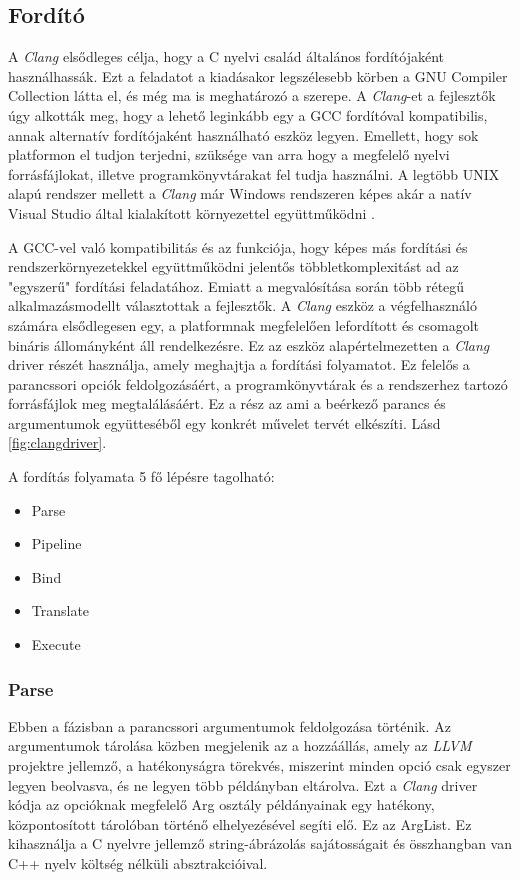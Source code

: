 \documentclass[a4paper,12pt]{report}
\begin{document}
\subsection{Fordító}
A \emph{Clang} elsődleges célja, hogy a C nyelvi család általános fordítójaként használhassák. Ezt a feladatot a kiadásakor legszélesebb körben a GNU Compiler Collection látta el, és még ma is meghatározó a szerepe. A \emph{Clang}-et a fejlesztők úgy alkották meg, hogy a lehető leginkább egy a GCC fordítóval kompatibilis, annak alternatív fordítójaként használható eszköz legyen. Emellett, hogy sok platformon el tudjon terjedni, szüksége van arra hogy a megfelelő nyelvi forrásfájlokat, illetve programkönyvtárakat fel tudja használni. A legtöbb UNIX alapú rendszer mellett a \emph{Clang} már Windows rendszeren képes akár a natív Visual Studio által kialakított környezettel együttműködni \cite{clangusermanual}.

A GCC-vel való kompatibilitás és az funkciója, hogy képes más fordítási és rendszerkörnyezetekkel együttműködni jelentős többletkomplexitást ad az "egyszerű" fordítási feladatához. Emiatt a megvalósítása során több rétegű alkalmazásmodellt választottak a fejlesztők. A \emph{Clang} eszköz a végfelhasználó számára elsődlegesen egy, a platformnak megfelelően lefordított és csomagolt bináris állományként áll rendelkezésre. Ez az eszköz alapértelmezetten a \emph{Clang} driver részét használja, amely meghajtja a fordítási folyamatot. Ez felelős a parancssori opciók feldolgozásáért, a programkönyvtárak és a rendszerhez tartozó forrásfájlok meg megtalálásáért. Ez a rész az ami a beérkező parancs és argumentumok együtteséből egy konkrét művelet tervét elkészíti. Lásd \ref{fig:clangdriver}.

A fordítás folyamata 5 fő lépésre tagolható:
\begin{itemize}
\item Parse
\item Pipeline
\item Bind
\item Translate
\item Execute
\end{itemize}

\subsubsection{Parse}
Ebben a fázisban a parancssori argumentumok feldolgozása történik. Az argumentumok tárolása közben megjelenik az a hozzáállás, amely az \emph{LLVM} projektre jellemző, a hatékonyságra törekvés, miszerint minden opció csak egyszer legyen beolvasva, és ne legyen több példányban eltárolva. Ezt a \emph{Clang} driver kódja az opcióknak megfelelő Arg osztály példányainak egy hatékony, központosított tárolóban történő elhelyezésével segíti elő. Ez az ArgList. Ez kihasználja a C nyelvre jellemző string-ábrázolás sajátosságait és  összhangban van C++ nyelv költség nélküli absztrakcióival.
\end{document}
